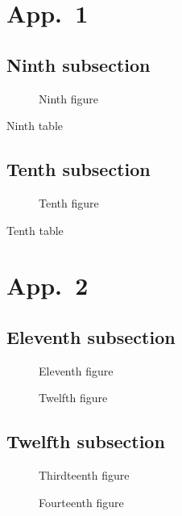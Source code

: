 \documentclass[oneside,12pt,a4paper]{article}
\begin{document}
\appendix
\section{App.~1}
\secttoc \mtcskip \sectlof \mtcskip \sectlot
\subsection{Ninth subsection}

\begin{figure} \caption{Ninth figure} \end{figure}
\begin{table} \caption{Ninth table} \end{table}

\subsection{Tenth subsection}

\begin{figure} \caption{Tenth figure} \end{figure}
\begin{table} \caption{Tenth table} \end{table}

\section{App.~2}
\secttoc \mtcskip \sectlof \mtcskip \sectlot
\subsection{Eleventh subsection}

\begin{figure} \caption{Eleventh figure} \end{figure}
\begin{figure} \caption{Twelfth figure} \end{figure}

\subsection{Twelfth subsection}

\begin{figure} \caption{Thirdteenth figure} \end{figure}
\begin{figure} \caption{Fourteenth figure} \end{figure}
\end{document}
